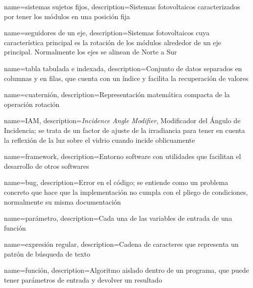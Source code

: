 {
    name={sistemas sujetos fijos},
    description={Sistemas fotovoltaicos caracterizados por tener los módulos en una posición fija}
}

{
    name={seguidores de un eje},
    description={Sistemas fotovoltaicos cuya característica principal es la rotación de los módulos alrededor de un eje principal. Normalmente los ejes se alinean de Norte a Sur}
}

{
    name={tabla tabulada e indexada},
    description={Conjunto de datos separados en columnas y en filas, que cuenta con un índice y facilita la recuperación de valores}
}

{
    name={cuaternión},
    description={Representación matemática compacta de la operación rotación}
}

{
    name={IAM},
    description={\textit{Incidence Angle Modifier}, Modificador del Ángulo de Incidencia; se trata de un factor de ajuste de la irradiancia para tener en cuenta la reflexión de la luz sobre el vidrio cuando incide oblicuamente}
}

{
    name={framework},
    description={Entorno \gls{software} con utilidades que facilitan el desarrollo de otros softwares}
}

{
    name={bug},
    description={Error en el código; se entiende como un problema concreto que hace que la implementación no cumpla con el pliego de condiciones, normalmente su misma \gls{documentación}}
}

{
    name={parámetro},
    description={Cada una de las variables de entrada de una función}
}

{
    name={expresión regular},
    description={Cadena de caracteres que representa un patrón de búsqueda de texto}
}

{
    name={función},
    description={Algoritmo aislado dentro de un programa, que puede tener parámetros de entrada y devolver un resultado}
}

